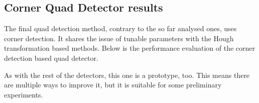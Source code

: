 \clearpage

\subsection{Corner Quad Detector results}

The final quad detection method, contrary to the so far analysed ones, uses corner detection.
It shares the issue of tunable parameters with the Hough transformation based methods.
Below is the performance evaluation of the corner detection based quad detector.

As with the rest of the detectors, this one is a prototype, too.
This means there are multiple ways to improve it, but it is suitable for some preliminary experiments.

